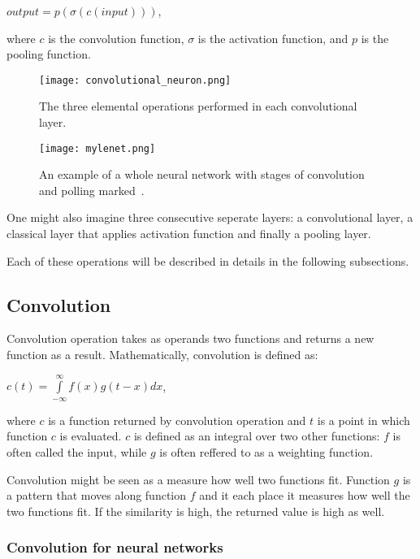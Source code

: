 \documentclass[a4paper,10pt]{report}
\begin{document}
	\begin{center}
	$output = p(\sigma(c(input)))$, 
	\end{center}
	
	
	where $c$ is the convolution function, $\sigma$ is the activation function, and $p$ is the pooling function. 
	
	\begin{figure}[h!]
	  \centering
	  \texttt{[image: convolutional\_neuron.png]}
	  \caption{The three elemental operations performed in each convolutional layer.}
	  \label{fig:con_neur}
	\end{figure} 
	
	\begin{figure}[h!]
	  \centering
	  \texttt{[image: mylenet.png]}
	  \caption{An example of a whole neural network with stages of convolution and polling marked~\cite{con_neur_INT}.}
	  \label{fig:con_neur_PIC}
	\end{figure} 
	One might also imagine three consecutive seperate layers: a convolutional layer, a classical layer that applies activation function and finally a pooling layer. 
	
	Each of these operations will be described in details in the following subsections. 
	
	\subsection{Convolution}\label{sec:convolution}
	Convolution operation takes as operands two functions and returns a new function as a result. Mathematically, convolution is defined as:  
	\begin{center}
	$c(t) = \int\limits_{-\infty}^\infty f(x)g(t-x)dx$, 
	\end{center}
	
	where $c$ is a function returned by convolution operation and $t$ is a point in which function $c$ is evaluated. $c$ is defined as an integral over two other functions: $f$ is often called the input, while $g$ is often reffered to as a weighting function. 
	
	Convolution might be seen as a measure how well two functions fit. Function $g$ is a pattern that moves along function $f$ and it each place it measures how well the two functions fit. If the similarity is high, the returned value is high as well. 
		
	\subsubsection{Convolution for neural networks}
	  
\end{document}
